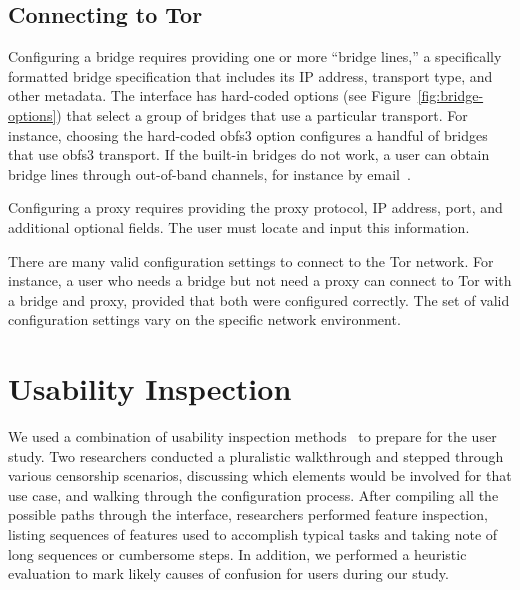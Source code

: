 \documentclass[USenglish,oneside,twocolumn]{article}
\begin{document}
\subsection{Connecting to Tor} 
 

Configuring a bridge requires providing one or more
``bridge lines,'' a specifically formatted bridge specification that
includes its IP address, transport type, and other metadata.
The interface has hard-coded options (see Figure~\ref{fig:bridge-options}) 
that select a group of bridges that use a particular transport.
For instance, choosing the hard-coded obfs3 option
configures a handful of bridges that use obfs3 transport.
If the built-in bridges do not work, a user can obtain bridge lines
through out-of-band channels, for instance by email~\cite{bridgedb}.

Configuring a proxy requires providing the proxy protocol, IP address, port, and additional optional fields. The user must locate and input this information. 

There are many valid configuration settings to connect to the Tor network.
For instance, a user who needs a bridge but not need a proxy can connect to Tor with a bridge and proxy, provided that both were configured correctly. The set of valid configuration settings vary on the specific network environment. 


\section{Usability Inspection}
{\color {red}
We used a combination of usability inspection methods~\cite{nielsen1994usability}
to prepare for the user study. Two researchers conducted a pluralistic 
walkthrough and stepped through various censorship
scenarios, discussing which elements would be involved for that use case, and walking 
through the configuration process. After compiling all the possible paths through the 
interface, researchers performed feature inspection, listing sequences of features used 
to accomplish typical tasks and taking note of long sequences or cumbersome
steps. In addition, we performed a heuristic evaluation to mark
likely causes of confusion for users during our study.
}
\end{document}
